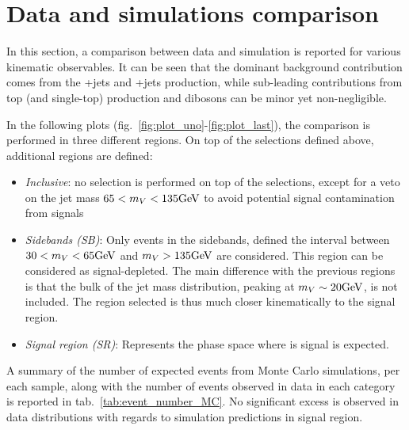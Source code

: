 \section{Data and simulations comparison}
\label{sec:datamc_comp}

In this section, a comparison between data and simulation is reported for various kinematic observables. It can be seen that the dominant background contribution comes from the \Z+jets and \W+jets production, while sub-leading contributions from top (\ttbar and single-top) production and dibosons can be minor yet non-negligible.

\noindent In the following plots (fig.~\ref{fig:plot_uno}-\ref{fig:plot_last}), the comparison is performed in three different regions. On top of the selections defined above, additional regions are defined:
\begin{itemize}
  \item \textit{Inclusive}: no selection is performed on top of the selections, except for a veto on the jet mass $65 < m_V < 135\text{GeV}$ to avoid potential signal contamination from \VZ signals
  \item \textit{Sidebands (SB)}: Only events in the sidebands, defined the interval between $30 < m_V < 65\text{GeV}$ and $m_V > 135\text{GeV}$ are considered. This region can be considered as signal-depleted. The main difference with the previous regions is that the bulk of the jet mass distribution, peaking at $m_V \sim 20\text{GeV}$, is not included. The region selected is thus much closer kinematically to the signal region.
  \item \textit{Signal region (SR)}: Represents the phase space where is signal is expected. %
\end{itemize}

\noindent A summary of the number of expected events from Monte Carlo simulations, per each sample, along with the number of events observed in data in each category is reported in tab.~\ref{tab:event_number_MC}. No significant excess is observed in data distributions with regards to simulation predictions in signal region.

